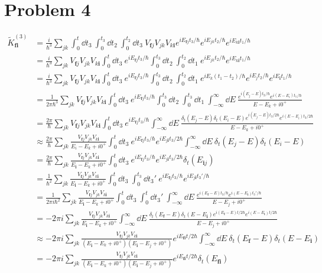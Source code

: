 \documentclass[12pt]{article}
\newcommand{\fullint}{\int_{-\infty}^\infty}
\newcommand{\fullintd}[1]{\fullint\dd#1\:}
\newcommand{\cint}[2]{\int_{#1}^{#2}}
\newcommand{\cintd}[3]{\cint{#1}{#2}\dd#3\:}
\begin{document}
\section*{Problem 4}
\begin{align*}
    \tilde{K}_\textbf{fi}^{(3)} &= \frac{i}{\hbar^3}\sum_{jk}\cintd{0}{t}{t_3}\cintd{0}{t_3}{t_2}\cintd{0}{t_2}{t_3}V_{\textbf{f}j}V_{jk}V_{k\textbf{i}}e^{iE_{\textbf{f}j}t_3/\hbar}e^{iE_{jk}t_2/\hbar}e^{iE_{k\textbf{i}}t_1/\hbar} \\
    &= \frac{i}{\hbar^3}\sum_{jk}V_{\textbf{f}j}V_{jk}V_{k\textbf{i}}\cintd{0}{t}{t_3}e^{iE_{\textbf{f}j}t_3/\hbar}\cintd{0}{t_3}{t_2}\cintd{0}{t_2}{t_1}e^{iE_{jk}t_2/\hbar}e^{iE_{k\textbf{i}}t_1/\hbar} \\
    &= \frac{i}{\hbar^3}\sum_{jk}V_{\textbf{f}j}V_{jk}V_{k\textbf{i}}\cintd{0}{t}{t_3}e^{iE_{\textbf{f}j}t_3/\hbar}\cintd{0}{t_3}{t_2}\cintd{0}{t_2}{t_1} e^{iE_k(t_1-t_2)/\hbar}e^{iE_jt_2/\hbar}e^{iE_\textbf{i}t_1/\hbar} \\
    &= \frac{1}{2\pi\hbar^3}\sum_{jk}V_{\textbf{f}j}V_{jk}V_{k\textbf{i}}\cintd{0}{t}{t_3}e^{iE_{\textbf{f}j}t_3/\hbar}\cintd{0}{t_3}{t_2}\cintd{0}{t_3}{t_1}\fullintd{E}\frac{e^{i(E_j - E)t_2/\hbar}e^{i(E-E_i)t_1/\hbar}}{E - E_k + i0^+} \\
    &= \frac{2\pi}{\hbar}\sum_{jk}V_{\textbf{f}j}V_{jk}V_{k\textbf{i}}\cintd{0}{t}{t_3}e^{iE_{\textbf{f}j}t_3/\hbar}\fullintd{E}\frac{\delta_t(E_j-E)\delta_t(E_i-E)e^{i(E_j-E)t_3/2\hbar}e^{i(E-E_i)t_3/2\hbar}}{E-E_k+i0^+} \\
    &\approx \frac{2\pi}{\hbar}\sum_{jk}\frac{V_{\textbf{f}j}V_{jk}V_{k\textbf{i}}}{E_i - E_k + i0^+}\cintd{0}{t}{t_3}e^{iE_{\textbf{f}j}t_3/\hbar}e^{iE_{j\textbf{i}}t_3/2\hbar}\fullintd{E}\delta_t(E_j-E)\delta_t(E_i-E) \\
    &= \frac{2\pi}{\hbar}\sum_{jk}\frac{V_{\textbf{f}j}V_{jk}V_{k\textbf{i}}}{E_\textbf{i}-E_k+i0^+}\cintd{0}{t}{t_3}e^{iE_{\textbf{f}j}t_3/\hbar}e^{iE_{j\textbf{i}}t_3/2\hbar}\delta_t(E_{\textbf{i}j}) \\
    &= \frac{1}{\hbar^2}\sum_{jk}\frac{V_{\textbf{f}j}V_{jk}V_{k\textbf{i}}}{E_\textbf{i}-E_k+i0^+}\cintd{0}{t}{t_3}\cintd{0}{t_3}{t_3'}e^{iE_{\textbf{f}j}t_3/\hbar}e^{iE_{j\textbf{i}}t_3'/\hbar} \\
    &= \frac{1}{2\pi i \hbar^2}\sum_{jk}\frac{V_{\textbf{f}j}V_{jk}V_{k\textbf{i}}}{E_\textbf{i}-E_k+i0^+}\cintd{0}{t}{t_3}\cintd{0}{t}{t_3'}\fullintd{E}\frac{e^{i(E_\textbf{f}-E)t_3/\hbar}e^{i(E-E_\textbf{i})t_3'/\hbar}}{E-E_j+i0^+} \\
    &= -2\pi i\sum_{jk}\frac{V_{\textbf{f}j}V_{jk}V_{k\textbf{i}}}{E_\textbf{i}-E_k+i0^+}\fullintd{E}\frac{\delta_t(E_\textbf{f}-E)\delta_t(E-E_\textbf{i})e^{i(E_\textbf{f}-E)t/2\hbar}e^{i(E-E_\textbf{i})t/2\hbar}}{E-E_j+i0^+} \\
    &\approx -2\pi i\sum_{jk}\frac{V_{\textbf{f}j}V_{jk}V_{k\textbf{i}}}{(E_\textbf{i}-E_k+i0^+)(E_\textbf{i}-E_j+i0^+)}e^{iE_\textbf{fi}t/2\hbar}\fullintd{E}\delta_t(E_\textbf{f}-E)\delta_t(E-E_\textbf{i}) \\
    &= -2\pi i\sum_{jk}\frac{V_{\textbf{f}j}V_{jk}V_{k\textbf{i}}}{(E_\textbf{i}-E_k+i0^+)(E_\textbf{i}-E_j+i0^+)}e^{iE_\textbf{fi}t/2\hbar}\delta_t(E_\textbf{fi})
\end{align*}
\end{document}
